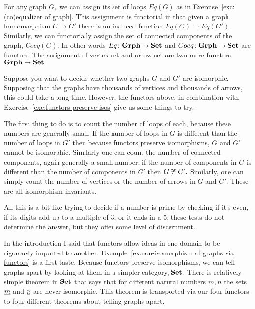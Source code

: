 \documentclass[../main/CT4S-EN-RU]{subfiles}
\begin{document}
\begin{exerciseRUS}\label{exc:functors preserve isos}
\end{exerciseRUS}

\begin{exampleENG}\label{ex:non-isomorphism of graphs via functors}
For any graph $G,$ we can assign its set of loops $Eq(G)$ as in Exercise~\ref{exc:(co)equalizer of graph}. This assignment is functorial in that given a graph homomorphism $G\to G'$ there is an induced function $Eq(G)\to Eq(G').$ Similarly, we can functorially assign the set of connected components of the graph, $Coeq(G).$ In other words $Eq\colon{\mathbf{Grph}}\rightarrow{\mathbf{Set}}$ and $Coeq\colon{\mathbf{Grph}}\rightarrow{\mathbf{Set}}$ are functors. The assignment of vertex set and arrow set are two more functors ${\mathbf{Grph}}\rightarrow{\mathbf{Set}}.$

Suppose you want to decide whether two graphs $G$ and $G'$ are isomorphic. Supposing that the graphs have thousands of vertices and thousands of arrows, this could take a long time. However, the functors above, in combination with Exercise~\ref{exc:functors preserve isos} give us some things to try.

The first thing to do is to count the number of loops of each, because these numbers are generally small. If the number of loops in $G$ is different than the number of loops in $G'$ then because functors preserve isomorphisms, $G$ and $G'$ cannot be isomorphic. Similarly one can count the number of connected components, again generally a small number; if the number of components in $G$ is different than the number of components in $G'$ then $G\not\cong G'.$ Similarly, one can simply count the number of vertices or the number of arrows in $G$ and $G'.$ These are all isomorphism invariants.  

All this is a bit like trying to decide if a number is prime by checking if it's even, if its digits add up to a multiple of 3, or it ends in a 5; these tests do not determine the answer, but they offer some level of discernment.
\end{exampleENG}

\begin{exampleRUS}\label{ex:non-isomorphism of graphs via functors}
\end{exampleRUS}

\begin{remarkENG}
In the introduction I said that functors allow ideas in one domain to be rigorously imported to another. Example~\ref{ex:non-isomorphism of graphs via functors} is a first taste. Because functors preserve isomorphisms, we can tell graphs apart by looking at them in a simpler category, ${\mathbf{Set}}.$ There is relatively simple theorem in ${\mathbf{Set}}$ that says that for different natural numbers $m,n$ the sets $\underline{m}$ and $\underline{n}$ are never isomorphic. This theorem is transported via our four functors to four different theorems about telling graphs apart.
\end{remarkENG}
\end{document}
